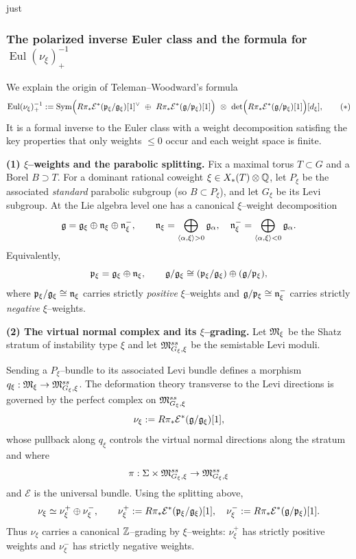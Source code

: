 just \documentclass[12pt]{article}
\DeclareMathOperator{\Eul}{Eul}
\begin{document}
\subsubsection{The polarized inverse Euler class and the formula for $\Eul(\nu_\xi)^{-1}_+$}

We explain the origin of Teleman--Woodward's formula
\[
\Eul(\nu_\xi)^{-1}_+
:=
\Sym\Bigl(
R\pi_*\mathcal E^*(\mf p_\xi/\mf g_\xi)[1]^\vee
\ \oplus\
R\pi_*\mathcal E^*(\mf g/\mf p_\xi)[1]
\Bigr)\ \otimes\
\det\Bigl(R\pi_*\mathcal E^*(\mf g/\mf p_\xi)[1]\Bigr)[d_\xi],
\tag{$\ast$}
\]
It is a formal inverse to the Euler class with a weight decomposition satisfing the key properties that only weights $\le 0$ occur and each weight space is finite.

\medskip
\noindent\textbf{(1) $\xi$--weights and the parabolic splitting.}
Fix a maximal torus $T\subset G$ and a Borel $B\supset T$.
For a dominant rational coweight $\xi\in X_*(T)\otimes\mathbb{Q}$, let
$P_\xi$ be the associated \emph{standard} parabolic subgroup (so $B\subset P_\xi$),
and let $G_\xi$ be its Levi subgroup.  At the Lie algebra level one has a canonical
$\xi$--weight decomposition
\[
\mathfrak{g} = \mathfrak{g}_\xi \oplus \mathfrak{n}_\xi \oplus \mathfrak{n}_\xi^-,
\qquad
\mathfrak{n}_\xi=\bigoplus_{\langle\alpha,\xi\rangle>0}\mathfrak{g}_\alpha,
\quad
\mathfrak{n}_\xi^-=\bigoplus_{\langle\alpha,\xi\rangle<0}\mathfrak{g}_\alpha.
\]
Equivalently,
\[
\mathfrak{p}_\xi=\mathfrak{g}_\xi\oplus \mathfrak{n}_\xi,
\qquad
\mathfrak{g}/\mathfrak{g}_\xi \cong (\mathfrak{p}_\xi/\mathfrak{g}_\xi)\oplus (\mathfrak{g}/\mathfrak{p}_\xi),
\]
where $\mathfrak{p}_\xi/\mathfrak{g}_\xi\cong \mathfrak{n}_\xi$ carries strictly \emph{positive} $\xi$--weights
and $\mathfrak{g}/\mathfrak{p}_\xi\cong \mathfrak{n}_\xi^-$ carries strictly \emph{negative} $\xi$--weights.

\medskip
\noindent\textbf{(2) The virtual normal complex and its $\xi$--grading.}
Let $\mathfrak{M}_\xi$ be the Shatz stratum of instability type $\xi$ and let
$\mathfrak{M}^{ss}_{G_\xi,\xi}$ be the semistable Levi moduli.

Sending a $P_\xi$--bundle to its associated Levi bundle defines a morphism
$q_\xi:\mathfrak{M}_\xi\to \mathfrak{M}^{ss}_{G_\xi,\xi}$.
The deformation theory transverse to the Levi directions is governed by the
perfect complex on $\mathfrak{M}^{ss}_{G_\xi,\xi}$
\[
\nu_\xi:= R\pi_*\mathcal E^*(\mathfrak{g}/\mathfrak{g}_\xi)[1],
\]
whose pullback along $q_\xi$ controls the virtual normal directions along the stratum and 
where \[\pi:\Sigma\times \mathfrak{M}^{ss}_{G_\xi,\xi}\to \mathfrak{M}^{ss}_{G_\xi,\xi}\] and
$\mathcal E$ is the universal bundle.
Using the splitting above,
\[
\nu_\xi \simeq \nu_\xi^+ \oplus \nu_\xi^-,
\qquad
\nu_\xi^+ := R\pi_*\mathcal E^*(\mathfrak{p}_\xi/\mathfrak{g}_\xi)[1],
\quad
\nu_\xi^- := R\pi_*\mathcal E^*(\mathfrak{g}/\mathfrak{p}_\xi)[1].
\]
Thus $\nu_\xi$ carries a canonical $\mathbb{Z}$--grading by $\xi$--weights: $\nu_\xi^+$ has
strictly positive weights and $\nu_\xi^-$ has strictly negative weights.
\end{document}
